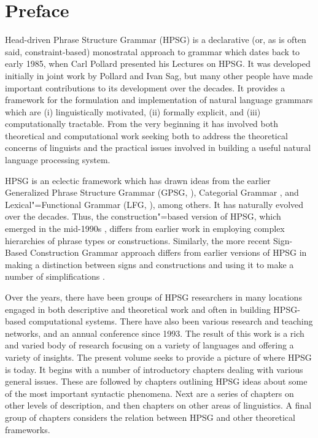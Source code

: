 \section{Preface}
\begin{refsection}

Head-driven Phrase Structure Grammar (HPSG) is a declarative (or, as is often said,
constraint-based) monostratal approach to grammar which dates back to early 1985, when Carl Pollard
presented his Lectures on HPSG. It was developed initially in joint work by Pollard and Ivan Sag,
but many other people have made important contributions to its development over the decades. It
provides a framework for the formulation and implementation of natural language grammars which are
(i) linguistically motivated, (ii) formally explicit, and (iii) computationally tractable. From the
very beginning it has involved both theoretical and computational work seeking both to address the
theoretical concerns of linguists and the practical issues involved in building a useful natural
language processing system.

HPSG is an eclectic framework which has drawn ideas from the earlier Generalized Phrase Structure
Grammar (GPSG, \citealp{GKPS85a}), Categorial Grammar \citep{Ajdukiewicz35a-u}, and Lexical"=Functional
Grammar (LFG, \citealp{Bresnan82a-ed}), among others. It has naturally evolved over the decades. Thus, the construction"=based version of
HPSG, which emerged in the mid-1990s \citep{Sag97a,GSag2000a-u}, differs from earlier work
\citep{ps,ps2} in employing complex hierarchies of phrase types or
constructions. Similarly, the more recent Sign-Based Construction Grammar approach differs from
earlier versions of HPSG in making a distinction between signs and constructions and using it to make a
number of simplifications \citep{Sag2012a}.

Over the years, there have been groups of HPSG researchers in many locations engaged in both
descriptive and theoretical work and often in building HPSG-based computational systems. There have
also been various research and teaching networks, and an annual conference since 1993. The result of
this work is a rich and varied body of research focusing on a variety of languages and offering a
variety of insights. The present volume seeks to provide a picture of where HPSG is today. It begins
with a number of introductory chapters dealing with various general issues. These are followed by
chapters outlining HPSG ideas about some of the most important syntactic phenomena. Next are a
series of chapters on other levels of description, and then chapters on other areas of
linguistics. A final group of chapters considers the relation between HPSG and other theoretical
frameworks.


\end{refsection}
